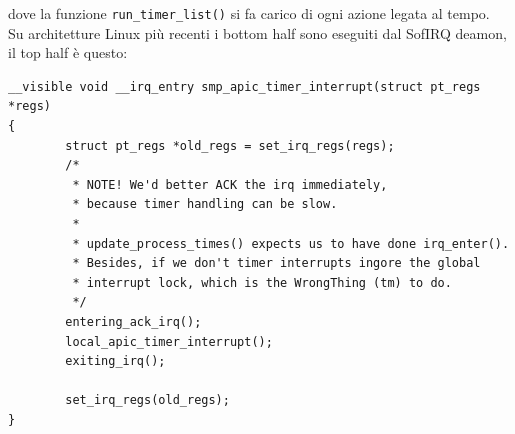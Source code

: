 \documentclass[12pt, oneside]{extbook}
\begin{document}
dove la funzione \texttt{run\_timer\_list()} si fa carico di ogni azione legata al tempo.\\Su architetture Linux più recenti i bottom half sono eseguiti dal SofIRQ deamon, il top half è questo:
\begin{lstlisting}
__visible void __irq_entry smp_apic_timer_interrupt(struct pt_regs *regs)
{
		struct pt_regs *old_regs = set_irq_regs(regs);
		/*
		 * NOTE! We'd better ACK the irq immediately,
		 * because timer handling can be slow.
		 *
		 * update_process_times() expects us to have done irq_enter().
		 * Besides, if we don't timer interrupts ingore the global
		 * interrupt lock, which is the WrongThing (tm) to do.
		 */
		entering_ack_irq();
		local_apic_timer_interrupt();
		exiting_irq();
		
		set_irq_regs(old_regs);
}
\end{lstlisting}
\end{document}
